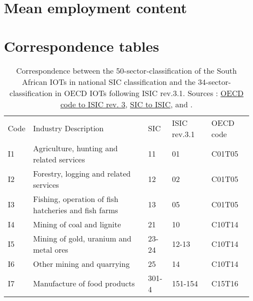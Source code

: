 \documentclass[12pt,english]{article}
\begin{document}
\section{Mean employment content} \label{ECmean}


\section{Correspondence tables}

\clearpage
\begin{table}[ht]
	\centering
	\vspace{-36pt}\hspace{-10pt}\caption{\label{correspondance_OECD_ZA}Correspondence between the 50-sector-classification of the South African IOTs in national SIC classification and the 34-sector-classification in OECD IOTs following ISIC rev.3.1. Sources : \href{http://www.oecd.org/sti/ind/IOT_Industries_Items.pdf}{OECD code to ISIC rev. 3}, \href{https://www.statssa.gov.za/additional_services/sic/descrip6.htm}{SIC to ISIC}, \cite{IOT2014} and .}
	\vspace{8pt}%
	\begin{adjustbox}{width=\textwidth}
	\normalsize
		\begin{tabular}{lp{500pt}lll}
		\toprule
		Code & Industry Description & SIC & ISIC rev.3.1 & OECD code \\ \arrayrulecolor{black!30}\midrule
		I1 & Agriculture, hunting and related services & 11 & 01 & C01T05 \\ \midrule
		I2 & Forestry, logging and related services & 12 & 02 & C01T05 \\ \midrule
		I3 & Fishing, operation of fish hatcheries and fish farms & 13 & 05 & C01T05 \\ \midrule
		I4 & Mining of coal and lignite & 21 & 10 & C10T14 \\ \midrule
		I5 & Mining of gold, uranium and metal ores  & 23-24 & 12-13 & C10T14 \\ \midrule
		I6 & Other mining and quarrying & 25 & 14 & C10T14 \\ \midrule
		I7 & Manufacture of food products & 301-4 & 151-154 & C15T16 \\ \midrule

\end{tabular}
\end{adjustbox}
\end{table}
\end{document}
